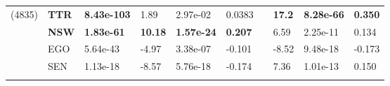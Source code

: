 \documentclass[11pt, a4paper]{article}
\begin{document}
\begin{ThreePartTable}
\begin{longtable}{L{1.5cm} L{1.3cm} L{1.7cm} p{1cm} p{1.5cm} p{1.2cm} p{0.05cm} p{1cm} p{1.5cm} p{1.3cm}}
		(4835)&\textbf{TTR}&\textbf{8.43e-103}&1.89&2.97e-02&0.0383&&\textbf{17.2}&\textbf{8.28e-66}& \textbf{0.350}\\
		&\textbf{NSW}& \textbf{1.83e-61}&\textbf{10.18}&\textbf{1.57e-24}& \textbf{0.207}&&6.59&2.25e-11&0.134\\
		&EGO& 5.64e-43&-4.97&3.38e-07&-0.101&&-8.52&9.48e-18&-0.173\\
		&SEN& 1.13e-18&-8.57&5.76e-18&-0.174&& 7.36&1.01e-13& 0.150\\
		\midrule[0.25mm]\\[-15pt]
	\end{longtable}
\end{ThreePartTable}
\end{document}
